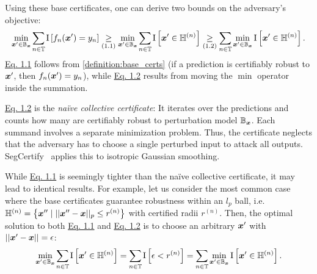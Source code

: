 \documentclass{article} %
\theoremstyle{plain}
\theoremstyle{definition}
\theoremstyle{remark}
\begin{document}
Using these base certificates, one can derive two bounds on the adversary's objective:
\begin{equation}
	\min_{\vx' \in \sB_\vx} \smashoperator{\sum_{n \in \sT}} \mathrm{I}\left[f_n(\vx') = \evy_n \right]
	\underset{(1.1)}{\geq}
	\min_{\vx' \in \sB_\vx} \smashoperator{\sum_{n \in \sT}} \mathrm{I}\left[\vx' \in \sH^{(n)} \right]
	\underset{(1.2)}{\geq}
	\smashoperator{\sum_{n \in \sT}} \min_{\vx' \in \sB_\vx}  \mathrm{I}\left[\vx' \in \sH^{(n)} \right].
	\label{eq:recipe}
\end{equation}
\hyperref[eq:recipe]{Eq. 1.1} follows from \autoref{definition:base_certs} (if a prediction is certifiably robust to ${\bm{x}}'$, then $f_n({\bm{x}}') = y_n$), while \hyperref[eq:recipe]{Eq. 1.2} results from moving the $\min$ operator inside the summation.

\hyperref[eq:recipe]{Eq. 1.2} is the \textit{na\"ive collective certificate}: It iterates over the predictions and counts how many are certifiably robust to perturbation model ${\mathbb{B}}_{\bm{x}}$.
Each summand involves a separate minimization problem.
Thus, the certificate
neglects that the adversary has to choose a single perturbed input
to attack all outputs. SegCertify~\citep{Fischer2021} applies this to isotropic Gaussian smoothing.

While \hyperref[eq:recipe]{Eq. 1.1} is seemingly tighter than the na\"ive collective certificate, 
it may lead to identical results.
For example, let us consider the most common case where the base certificates guarantee robustness within an $l_p$ ball, i.e.\ ${\mathbb{H}}^{(n)} = \left\{{\bm{x}}'' \mid ||{\bm{x}}'' - {\bm{x}}||_p \leq r^{(n)}\right\}$ with certified radii $r^{(n)}$. Then, the optimal solution to both \hyperref[eq:recipe]{Eq. 1.1} and \hyperref[eq:recipe]{Eq. 1.2} is to choose an arbitrary
${\bm{x}}'$ with $||{\bm{x}}' - {\bm{x}}|| = \epsilon$:
\begin{equation*}
		\min_{\vx' \in \sB_\vx} \smashoperator{\sum_{n \in \sT}} \mathrm{I}\left[\vx' \in \sH^{(n)} \right]
		= \smashoperator{\sum_{n \in \sT}} \mathrm{I}\left[\epsilon < r^{(n)} \right]
		=  \smashoperator{\sum_{n \in \sT}} \min_{\vx' \in \sB_\vx} \mathrm{I}\left[\vx' \in \sH^{(n)} \right].
\end{equation*}
\end{document}
